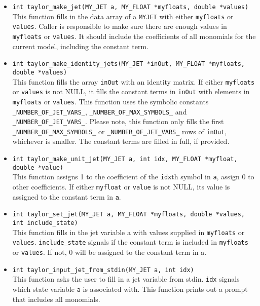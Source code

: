 \documentclass[10pt]{article}
\theoremstyle{remark}
\newcommand{\myjet}{{\tt MY\symbol{95}JET}}
\begin{document}
\begin{itemize}
\item {\verb+int taylor_make_jet(MY_JET a, MY_FLOAT *myfloats, double *values)+  \\  
    This function fills in the data array of a \myjet{} with either
    \verb+myfloats+ or \verb+values+. Caller is responsible to make
    sure there are enough values in \verb+myfloats+ or
    \verb+values+. It should include the coefficients of all monomials
    for the current model, including the constant term.}
    
\item{\verb+int taylor_make_identity_jets(MY_JET *inOut, MY_FLOAT *myfloats, double *values)+ \\
    This function fills the array \verb+inOut+ with an identity
    matrix. If either \verb+myfloats+ or \verb+values+ is not NULL, it
    fills the constant terms in \verb+inOut+ with elements in
    \verb+myfloats+ or \verb+values+.  This function uses the symbolic
    constants \verb+_NUMBER_OF_JET_VARS_+, \verb+_NUMBER_OF_MAX_SYMBOLS_+
    and \verb+_NUMBER_OF_JET_VARS_+.  Please note, this function
    only fills the first \verb+_NUMBER_OF_MAX_SYMBOLS_+ or
    \verb+_NUMBER_OF_JET_VARS_+ rows of \verb+inOut+, whichever is
    smaller. The constant terms are filled in full, if provided.}
    
\item{\verb+int taylor_make_unit_jet(MY_JET a, int idx, MY_FLOAT *myfloat, double *value)+\\
    This function assigns 1 to the coefficient of the \verb+idx+th
    symbol in \verb+a+, assign 0 to other coefficients. If either
    \verb+myfloat+ or \verb+value+ is not NULL, its value is assigned
    to the constant term in \verb+a+.  }
    
\item{\verb+int taylor_set_jet(MY_JET a, MY_FLOAT *myfloats, double *values, int include_state)+\\
    This function fills in the jet variable a with values supplied in
    \verb+myfloats+ or \verb+values+. \verb+include_state+ signals if
    the constant term is included in \verb+myfloats+ or
    \verb+values+. If not, 0 will be assigned to the constant term in
    a. }
    
\item{\verb+int taylor_input_jet_from_stdin(MY_JET a, int idx)+\\
    This function asks the user to fill in a jet variable from stdin.
    \verb+idx+ signals which state variable \verb+a+ is associated
    with.  This function prints out a prompt that includes all
    monomials.}
    

\end{itemize}
\end{document}

